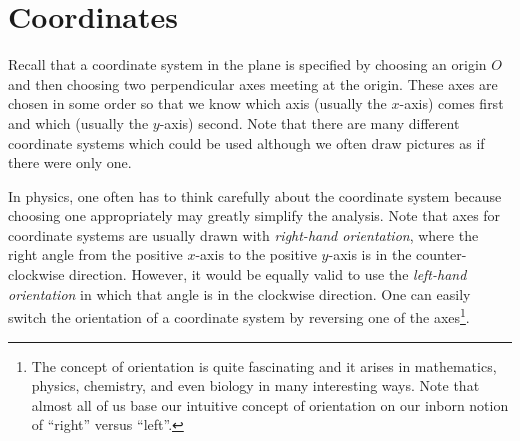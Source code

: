 \section{Coordinates}
Recall that a coordinate system in the plane is specified by choosing
an origin $O$ and then choosing two perpendicular axes meeting at
the origin.  These axes are chosen in some order so that we know which
axis (usually the $x$-axis) comes first and which (usually the
$y$-axis) second.   Note that there are many different coordinate systems
which could be used although we often draw pictures
as if there were only one.

In physics, one often has to think carefully about the
coordinate system because
choosing one appropriately may greatly simplify the
analysis.  Note that axes for coordinate systems are usually drawn with 
\emph{right-hand orientation}, where the right angle from the positive
$x$-axis to the positive $y$-axis is in the counter-clockwise
direction.  However, it would be equally valid to use the
\emph{left-hand orientation} in which that angle is in the
clockwise direction.  One can easily switch the orientation of
a coordinate system by reversing one of the axes\footnote{
	The concept of
orientation is quite fascinating and it arises in mathematics,
physics, chemistry, and even biology in many interesting ways.
Note that almost all of us base our intuitive concept of orientation
on our inborn notion of ``right'' versus ``left''.}.

